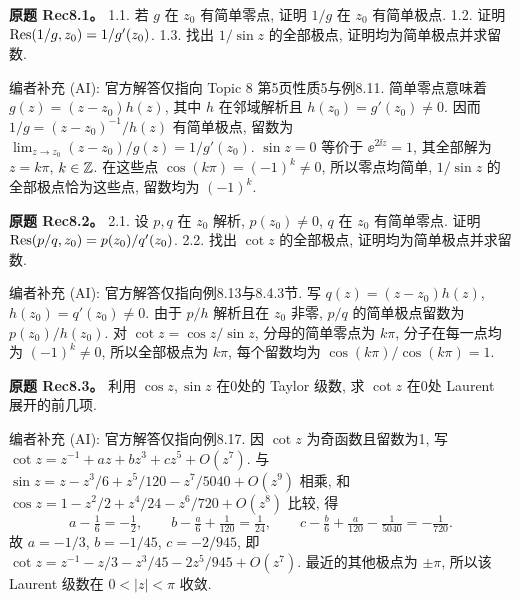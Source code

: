 \begin{exercise}
\textbf{原题 Rec8.1。}\label{ass:rec8-1}
1.1. 若 $g$ 在 $z_0$ 有简单零点, 证明 $1/g$ 在 $z_0$ 有简单极点. 1.2. 证明 $\operatorname{Res}(1/g,z_0)=1/g'(z_0)$. 1.3. 找出 $1/\sin z$ 的全部极点, 证明均为简单极点并求留数.
\end{exercise}
\begin{solution}
编者补充 (AI): 官方解答仅指向 Topic 8 第5页性质5与例8.11. 简单零点意味着 $g(z)=(z-z_0)h(z)$, 其中 $h$ 在邻域解析且 $h(z_0)=g'(z_0)\ne0$. 因而 $1/g=(z-z_0)^{-1}/h(z)$ 有简单极点, 留数为 $\lim_{z\to z_0}(z-z_0)/g(z)=1/g'(z_0)$. $\sin z=0$ 等价于 $\ee^{2\ii z}=1$, 其全部解为 $z=k\pi$, $k\in\mathbb Z$. 在这些点 $\cos(k\pi)=(-1)^k\ne0$, 所以零点均简单, $1/\sin z$ 的全部极点恰为这些点, 留数均为 $(-1)^k$.
\end{solution}
\begin{exercise}
\textbf{原题 Rec8.2。}\label{ass:rec8-2}
2.1. 设 $p,q$ 在 $z_0$ 解析, $p(z_0)\ne0$, $q$ 在 $z_0$ 有简单零点. 证明 $\operatorname{Res}(p/q,z_0)=p(z_0)/q'(z_0)$. 2.2. 找出 $\cot z$ 的全部极点, 证明均为简单极点并求留数.
\end{exercise}
\begin{solution}
编者补充 (AI): 官方解答仅指向例8.13与8.4.3节. 写 $q(z)=(z-z_0)h(z)$, $h(z_0)=q'(z_0)\ne0$. 由于 $p/h$ 解析且在 $z_0$ 非零, $p/q$ 的简单极点留数为 $p(z_0)/h(z_0)$. 对 $\cot z=\cos z/\sin z$, 分母的简单零点为 $k\pi$, 分子在每一点均为 $(-1)^k\ne0$, 所以全部极点为 $k\pi$, 每个留数均为 $\cos(k\pi)/\cos(k\pi)=1$.
\end{solution}
\begin{exercise}
\textbf{原题 Rec8.3。}\label{ass:rec8-3}
利用 $\cos z,\sin z$ 在0处的 Taylor 级数, 求 $\cot z$ 在0处 Laurent 展开的前几项.
\end{exercise}
\begin{solution}
编者补充 (AI): 官方解答仅指向例8.17. 因 $\cot z$ 为奇函数且留数为1, 写 $\cot z=z^{-1}+az+bz^3+cz^5+O(z^7)$. 与 $\sin z=z-z^3/6+z^5/120-z^7/5040+O(z^9)$ 相乘, 和 $\cos z=1-z^2/2+z^4/24-z^6/720+O(z^8)$ 比较, 得
\[
a-\tfrac16=-\tfrac12,\qquad b-\tfrac a6+\tfrac1{120}=\tfrac1{24},\qquad
c-\tfrac b6+\tfrac a{120}-\tfrac1{5040}=-\tfrac1{720}.
\]
故 $a=-1/3$, $b=-1/45$, $c=-2/945$, 即 $\cot z=z^{-1}-z/3-z^3/45-2z^5/945+O(z^7)$. 最近的其他极点为 $\pm\pi$, 所以该 Laurent 级数在 $0<|z|<\pi$ 收敛.
\end{solution}
